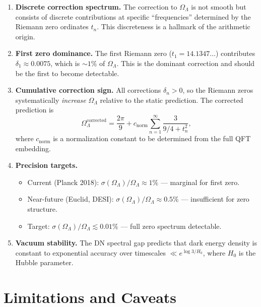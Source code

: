 \documentclass[12pt,a4paper]{article}
\newcommand{\OL}{\Omega_\Lambda}
\begin{document}
\begin{enumerate}[label=\textbf{P\arabic*.}]
\item \textbf{Discrete correction spectrum.} The correction to $\OL$ is not smooth but consists of discrete contributions at specific ``frequencies'' determined by the Riemann zero ordinates $t_n$. This discreteness is a hallmark of the arithmetic origin.

\item \textbf{First zero dominance.} The first Riemann zero ($t_1 = 14.1347\ldots$) contributes $\delta_1 \approx 0.0075$, which is $\sim 1\%$ of $\OL$. This is the dominant correction and should be the first to become detectable.

\item \textbf{Cumulative correction sign.} All corrections $\delta_n > 0$, so the Riemann zeros systematically \emph{increase} $\OL$ relative to the static prediction. The corrected prediction is
\begin{equation}
  \OL^{\mathrm{corrected}} = \frac{2\pi}{9} + c_{\mathrm{norm}}\sum_{n=1}^{\infty}\frac{3}{9/4 + t_n^2},
\end{equation}
where $c_{\mathrm{norm}}$ is a normalization constant to be determined from the full QFT embedding.

\item \textbf{Precision targets.}
\begin{itemize}
\item Current (Planck 2018): $\sigma(\OL)/\OL \approx 1\%$ --- marginal for first zero.
\item Near-future (Euclid, DESI): $\sigma(\OL)/\OL \approx 0.5\%$ --- insufficient for zero structure.
\item Target: $\sigma(\OL)/\OL \lesssim 0.01\%$ --- full zero spectrum detectable.
\end{itemize}

\item \textbf{Vacuum stability.} The DN spectral gap predicts that dark energy density is constant to exponential accuracy over timescales $\ll e^{\log 3/H_0}$, where $H_0$ is the Hubble parameter.
\end{enumerate}

\section{Limitations and Caveats}
\label{sec:limitations}
\end{document}
